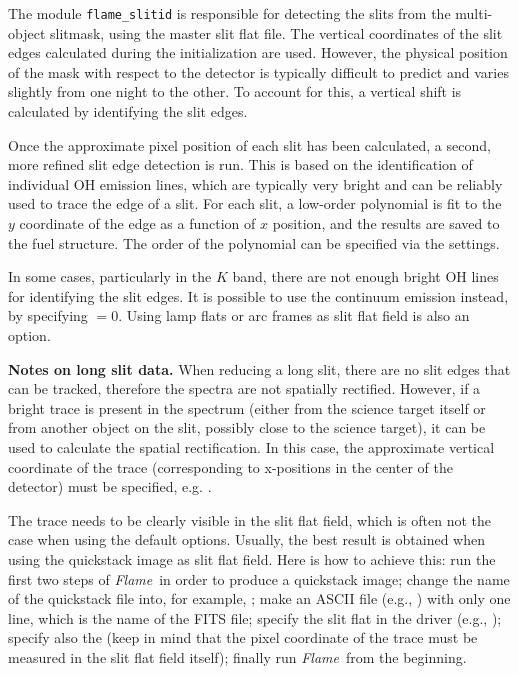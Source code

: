 \documentclass[a4paper]{article}
\newcommand{\flame}{\emph{Flame}}
\begin{document}
\begin{sloppypar}
The module \texttt{flame\_slitid} is responsible for detecting the slits from the multi-object slitmask, using the master slit flat file. The vertical coordinates of the slit edges calculated during the initialization are used. However, the physical position of the mask with respect to the detector is typically difficult to predict and varies slightly from one night to the other. To account for this, a vertical shift is calculated by identifying the slit edges.

Once the approximate pixel position of each slit has been calculated, a second, more refined slit edge detection is run. This is based on the identification of individual OH emission lines, which are typically very bright and can be reliably used to trace the edge of a slit. For each slit, a low-order polynomial is fit to the $y$ coordinate of the edge as a function of $x$ position, and the results are saved to the fuel structure. The order of the polynomial can be specified via the settings.

In some cases, particularly in the $K$ band, there are not enough bright OH lines for identifying the slit edges. It is possible to use the continuum emission instead, by specifying $ = 0$. Using lamp flats or arc frames as slit flat field is also an option.

\medskip
\noindent
\textbf{Notes on long slit data.} When reducing a long slit, there are no slit edges that can be tracked, therefore the spectra are not spatially rectified. However, if a bright trace is present in the spectrum (either from the science target itself or from another object on the slit, possibly close to the science target), it can be used to calculate the spatial rectification. In this case, the approximate vertical coordinate of the trace (corresponding to x-positions in the center of the detector) must be specified, e.g. .

The trace needs to be clearly visible in the slit flat field, which is often not the case when using the default options. Usually, the best result is obtained when using the quickstack image as slit flat field. Here is how to achieve this: run the first two steps of \flame\ in order to produce a quickstack image; change the name of the quickstack file into, for example, ; make an ASCII file (e.g., ) with only one line, which is the name of the FITS file; specify the slit flat in the driver (e.g., ); specify also the  (keep in mind that the pixel coordinate of the trace must be measured in the slit flat field itself); finally run \flame\ from the beginning.


\end{sloppypar}
\end{document}
